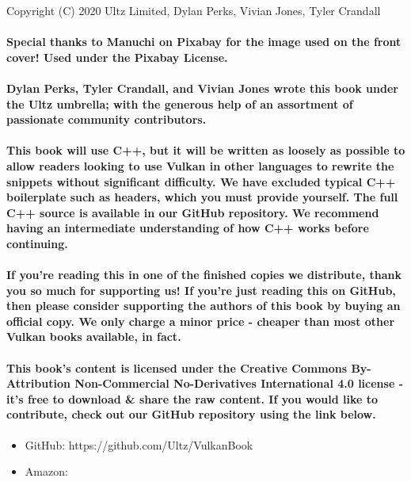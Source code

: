 Copyright (C) 2020 Ultz Limited, Dylan Perks, Vivian Jones, Tyler Crandall
\paragraph{
    Special thanks to Manuchi on Pixabay for the image used on the front cover! Used under the Pixabay License.
}
\paragraph{
    Dylan Perks, Tyler Crandall, and Vivian Jones wrote this book under the Ultz umbrella; with the generous help of an assortment of passionate community contributors.
}

\paragraph{
    This book will use C++, but it will be written as loosely as possible to allow readers looking to use Vulkan in other languages to rewrite the snippets without significant difficulty. We have excluded typical C++ boilerplate such as headers, which you must provide yourself. The full C++ source is available in our GitHub repository. We recommend having an intermediate understanding of how C++ works before continuing.
}

\paragraph{
    If you're reading this in one of the finished copies we distribute, thank you so much for supporting us! If you're just reading this on GitHub, then please consider supporting the authors of this book by buying an official copy. We only charge a minor price - cheaper than most other Vulkan books available, in fact.
}

\paragraph{
    This book's content is licensed under the Creative Commons By-Attribution Non-Commercial No-Derivatives International 4.0 license - it's free to download \& share the raw content. If you would like to contribute, check out our GitHub repository using the link below.
}

\begin{itemize}
\itemsep1pt\parskip0pt
\item
  GitHub: https://github.com/Ultz/VulkanBook
\item
  Amazon: 
\end{itemize}
\newpage